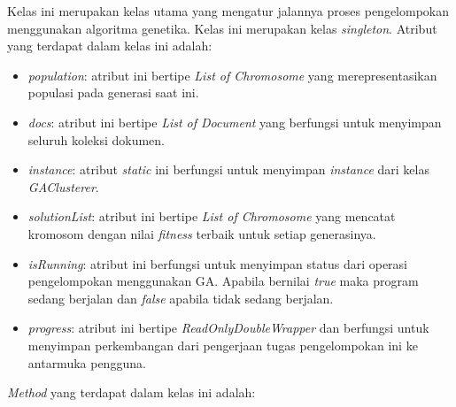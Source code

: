 Kelas ini merupakan kelas utama yang mengatur jalannya proses pengelompokan menggunakan algoritma genetika. Kelas ini merupakan kelas \textit{singleton}. Atribut yang terdapat dalam kelas ini adalah:

\begin{itemize}
	\item \textit{population}: atribut ini bertipe \textit{List of Chromosome} yang merepresentasikan populasi pada generasi saat ini.
	\item \textit{docs}: atribut ini bertipe \textit{List of Document} yang berfungsi untuk menyimpan seluruh koleksi dokumen.
	\item \textit{instance}: atribut \textit{static} ini berfungsi untuk menyimpan \textit{instance} dari kelas \textit{GAClusterer}.
	\item \textit{solutionList}: atribut ini bertipe \textit{List of Chromosome} yang mencatat kromosom dengan nilai \textit{fitness} terbaik untuk setiap generasinya.
	\item \textit{isRunning}: atribut ini berfungsi untuk menyimpan status dari operasi pengelompokan menggunakan GA. Apabila bernilai \textit{true} maka program sedang berjalan dan \textit{false} apabila tidak sedang berjalan.
	\item \textit{progress}: atribut ini bertipe \textit{ReadOnlyDoubleWrapper} dan berfungsi untuk menyimpan perkembangan dari pengerjaan tugas pengelompokan ini ke antarmuka pengguna.
\end{itemize}

\textit{Method} yang terdapat dalam kelas ini adalah:

